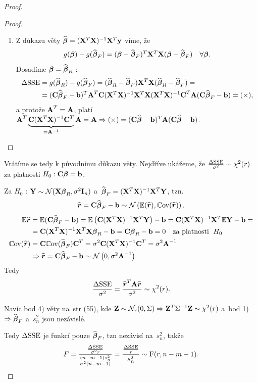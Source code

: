 \begin{proof}
\begin{proof}
\begin{enumerate}
\item
Z důkazu věty $\wbetab = \xtx \X^T \y$ víme, že
 $$
g(\betab) - g(\wbetab_F) = (\betab - \wbetab_F)^T \X^T \X (\betab - \wbetab_F) \quad \forall \betab.
 $$
Dosadíme $\betab = \wbetab_R$ :
\begin{align*}
	\Delta \SSE & = g(\wbetab_R) - g(\wbetab_F) = (\wbetab_R - \wbetab_F) \X^T \X (\wbetab_R - \wbetab_F) = \\
	& = (\Cm \wbetab_F - \bb)^T \Am^T \Cm \xtx \X^T \X \xtx \Cm^T \Am (\Cm \wbetab_F - \bb) = (\times),
\end{align*}
a protože $\Am^T = \Am$, platí $\Am^T\underbrace{\Cm \xtx \Cm^T}_{ = \Am^{-1}} \Am = \Am \Rightarrow (\times) = (\Cm \wbetab - \bb)^T \Am (\Cm \wbetab - \bb)$.

\end{enumerate}
\end{proof}


Vrátíme se tedy k původnímu důkazu věty. Nejdříve ukážeme, že $\frac{\Delta \SSE}{\sigma^2} \sim \chi^2 (r)$ za platnosti $H_0: \Cm\betab = \bb$.

Za $H_0$ : $\Y \sim \NN(\X \betab_R, \sigma^2 \Identita{n})$ a~$\wbetab_F = \xtx \X^T \Y$, tzn.
 $$
\widehat{\boldsymbol{r}} = \Cm \wbetab_F - \bb \sim \NN\left(\E(\widehat{\boldsymbol{r}}), \Cov(\widehat{\boldsymbol{r}}) \right).
 $$
\begin{align*}
\E \widehat{\boldsymbol{r}} & = \E (\Cm \wbetab_F - \bb) = \E \left(\Cm \xtx \X^T \Y \right) - \bb = \Cm \xtx \X^T \E \Y - \bb = \\
& = \Cm \xtx \X^T \X \betab_R - \bb = \Cm \betab_R - \bb = 0 \quad \text{za platnosti \;} H_0 \\
\Cov(\widehat{\boldsymbol{r}}) & = \Cm \Cov(\wbetab_F) \Cm^T = \sigma^2 \Cm \xtx \Cm^T = \sigma^2 \Am^{-1} \\
& \Rightarrow \widehat{\boldsymbol{r}} = \Cm \wbetab_F - \bb \sim \NN \left(0, \sigma^2 \Am^{-1} \right)
\end{align*}
Tedy
 $$
\frac{\Delta \SSE}{\sigma^2} = \frac{\widehat{\boldsymbol{r}}^T \Am \widehat{\boldsymbol{r}}}{\sigma^2} \sim \chi^2(r).
 $$

Navíc bod 4) věty na~str (55), kde $\Zb \sim \NN_r(0, \Sigma) \Rightarrow \Zb^T \Sigma^{-1} \Zb \sim \chi^2(r)$ a~bod 1) $\Rightarrow \wbetab_F$ a~$s_n^2$ jsou nezávislé.

Tedy $\Delta \SSE$ je funkcí pouze $\wbetab_F$, tzn nezávisí na~$s_n^2$, takže
 $$
F = \frac{\frac{\Delta \SSE}{\sigma^2 r}}{\frac{(n-m-1)s_n^2}{\sigma^2(n-m-1)}} = \frac{\frac{\Delta \SSE}{r}}{s_n^2} \sim \FF(r, n-m-1).
 $$
\end{proof}

